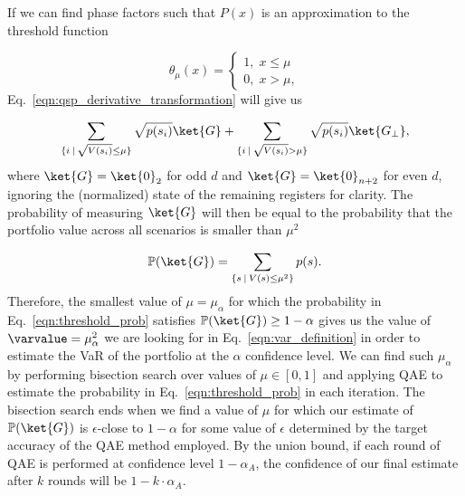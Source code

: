 \begin{enumerate}
If we can find phase factors such that $P(x)$ is an approximation to the threshold function

\begin{equation}
	\label{eqn:threshold_function}
	\theta_{\mu}(x) = \begin{cases}
1, \; {x} \le {\mu} \\
0, \; {x} > {\mu},
\end{cases}
\end{equation}
Eq.~\eqref{eqn:qsp_derivative_transformation} will give us

\begin{equation}
	\label{eqn:qsp_var_final_state}
	\sum_{\{i  \: | \: \sqrt{V(s_i)} \le \mu\}}\sqrt{p(s_i)}\ket{G} + \sum_{\{i  \: | \: \sqrt{V(s_i)} > \mu\}}\sqrt{p(s_i)}\ket{G_{\perp}},
\end{equation}
where $\ket{G}=\ket{0}_2$ for odd $d$ and $\ket{G}=\ket{0}_{n+2}$ for even $d$, ignoring the (normalized) state of the remaining registers for clarity.
The probability of measuring $\ket{G}$ will then be equal to the probability that the portfolio value across all scenarios is smaller than $\mu^2$

\begin{equation}
	\label{eqn:threshold_prob}
	\mathbb{P}(\ket{G}) = \sum_{ \{s  \: | \: V(s) \le \mu^2\} } p(s).
\end{equation}
Therefore, the smallest value of $\mu = \mu_{\alpha}$ for which the probability in Eq.~\eqref{eqn:threshold_prob} satisfies $\mathbb{P}(\ket{G}) \ge 1-\alpha$ gives us the value of $\varvalue=\mu_{\alpha}^2$ we are looking for in Eq.~\eqref{eqn:var_definition} in order to estimate the VaR of the portfolio at the $\alpha$ confidence level.
We can find such $\mu_{\alpha}$ by performing bisection search over values of $\mu \in [0, 1]$ and applying QAE to estimate the probability in Eq.~\eqref{eqn:threshold_prob} in each iteration.
The bisection search ends when we find a value of $\mu$ for which our estimate of $\mathbb{P}(\ket{G})$ is $\epsilon$-close to $1-\alpha$ for some value of $\epsilon$ determined by the target accuracy of the QAE method employed.
By the union bound, if each round of QAE is performed at confidence level $1-\alpha_{A}$, the confidence of our final \var{} estimate after $k$ rounds will be $1-k\cdot\alpha_{A}$.


\end{enumerate}
